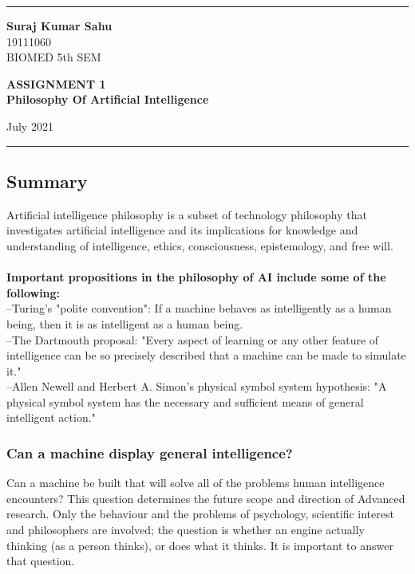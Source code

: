 \documentclass[12pt,a4paper]{article}
\begin{document}
    
    \hrule \medskip %
    \begin{minipage}{0.3\textwidth}
    \raggedright
    \small
    \textbf{Suraj Kumar Sahu}
    \\
    19111060
    \\
    BIOMED 5th SEM
    
    \end{minipage}
    \begin{minipage}{0.48\textwidth} 
    \centering 
    \large 
    \textbf{ASSIGNMENT 1}\\
    \footnotesize
    \textbf{Philosophy Of Artificial Intelligence}\\ 
    \end{minipage}
    \begin{minipage}{0.18\textwidth}
     July 2021 \hfill\\
    \end{minipage}
    \medskip\hrule 
    \bigskip

\subsection*{Summary}
Artificial intelligence philosophy is a subset of technology philosophy that investigates artificial intelligence and its implications for knowledge and understanding of intelligence, ethics, consciousness, epistemology, and free will.
\\
\\
  \textbf{Important propositions in the philosophy of AI include some of the following:}\\
    --Turing's "polite convention": If a machine behaves as intelligently as a human being, then it is as intelligent as a human being.\\
    --The Dartmouth proposal: "Every aspect of learning or any other feature of intelligence can be so precisely described that a machine can be made to simulate it."\\
    --Allen Newell and Herbert A. Simon's physical symbol system hypothesis: "A physical symbol system has the necessary and sufficient means of general intelligent action."\\

\subsubsection* {Can a machine display general intelligence?}
Can a machine be built that will solve all of the problems human intelligence encounters? This question determines the future scope and direction of Advanced research. Only the behaviour and the problems of psychology, scientific interest and philosophers are involved; the question is whether an engine actually thinking (as a person thinks), or does what it thinks. It is important to answer that question.
\end{document}
